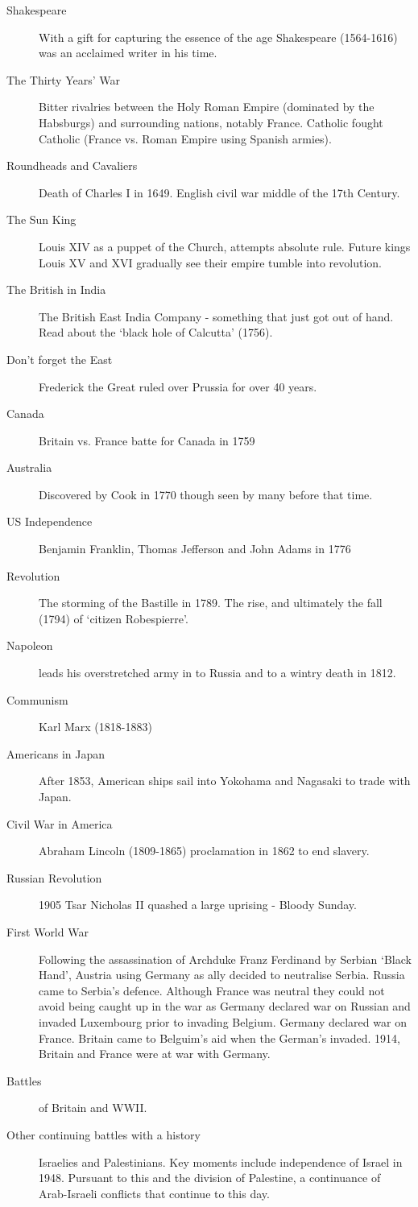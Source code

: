 \begin{description}
\item [Shakespeare] With a gift for capturing the essence of the age Shakespeare (1564-1616) was an acclaimed writer in his time.
\item [The Thirty Years' War] Bitter rivalries between the Holy Roman Empire (dominated by the Habsburgs) and surrounding nations, notably France. Catholic fought Catholic (France vs. Roman Empire using Spanish armies). 
\item [Roundheads and Cavaliers] Death of Charles I in 1649. English civil war middle of the 17th Century. 
\item [The Sun King] Louis XIV as a puppet of the Church, attempts absolute rule. Future kings Louis XV and XVI gradually see their empire tumble into revolution. 
\item [The British in India] The British East India Company - something that just got out of hand. Read about the `black hole of Calcutta' (1756).
\item [Don't forget the East] Frederick the Great ruled over Prussia for over 40 years. 
\item [Canada] Britain vs. France batte for Canada in 1759
\item [Australia] Discovered by Cook in 1770 though seen by many before that time. 
\item [US Independence] Benjamin Franklin, Thomas Jefferson and John Adams in 1776
\item [Revolution] The storming of the Bastille in 1789. The rise, and ultimately the fall (1794) of `citizen Robespierre'. 
\item [Napoleon] leads his overstretched army in to Russia and to a wintry death in 1812.
\item [Communism] Karl Marx (1818-1883)
\item [Americans in Japan] After 1853, American ships sail into Yokohama and Nagasaki to trade with Japan. 
\item [Civil War in America] Abraham Lincoln (1809-1865) proclamation in 1862 to end slavery. 
\item [Russian Revolution] 1905 Tsar Nicholas II quashed a large uprising - Bloody Sunday. 
\item [First World War] Following the assassination of Archduke Franz Ferdinand by Serbian `Black Hand', Austria using Germany as ally decided to neutralise Serbia. Russia came to Serbia's defence. Although France was neutral they could not avoid being caught up in the war as Germany declared war on Russian and invaded Luxembourg prior to invading Belgium. Germany declared war on France. Britain came to Belguim's aid when the German's invaded. 1914, Britain and France were at war with Germany. 
\item [Battles] of Britain and WWII. 
\item [Other continuing battles with a history] Israelies and Palestinians. Key moments include independence of Israel in 1948. Pursuant to this and the division of Palestine, a continuance of Arab-Israeli conflicts that continue to this day.    
\end{description}



